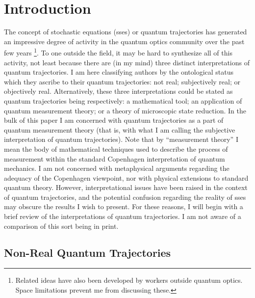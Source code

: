\documentclass[12pt]{article}
\begin{document}
\section{Introduction}

The concept of stochastic \sch equations ({\sc sse}s) \cite{DalCasMol92} or quantum
trajectories \cite{Car93b} has generated an impressive degree of activity in the
quantum optics community over the past few years \footnote{Related ideas have also
been developed by workers outside quantum optics. Space limitations prevent me from
discussing these.}. To one outside the field, it may be hard to synthesize all of
this activity, not least because there are (in my mind) three distinct
interpretations of quantum trajectories. I am here classifying authors by the
ontological status which they ascribe to their quantum trajectories: not real;
subjectively real; or objectively real. Alternatively, these three interpretations
could be stated as quantum trajectories being respectively: a mathematical tool; an
application of quantum measurement theory; or a theory of microscopic state
reduction. In the bulk of this paper I am concerned with quantum trajectories as a
part of quantum measurement theory (that is, with what I am calling the subjective
interpretation of quantum trajectories). Note that by ``measurement theory'' I mean
the body of mathematical techniques used to describe the process of measurement
within the standard Copenhagen interpretation \cite{Boh58,Hei59} of quantum
mechanics. I am not concerned with  metaphysical arguments regarding the adequacy of
the Copenhagen viewpoint, nor with physical extensions to standard quantum theory.
However, interpretational issues have been raised in the context of quantum
trajectories, and the potential confusion regarding the reality of {\sc sse}s may
obscure the results I wish to present. For these reasons, I will begin with a brief
review of the interpretations of quantum trajectories. I am not aware of a
comparison of this sort being in print.

\subsection{Non-Real Quantum Trajectories}
\end{document}
